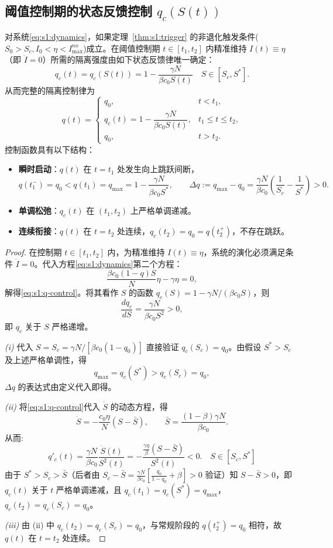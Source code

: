 \documentclass[lang=cn,a4paper,newtx]{elegantpaper}
\numberwithin{equation}{section}
\theoremstyle{plain}
\begin{document}
\subsection{阈值控制期的状态反馈控制 $q_c(S(t))$}
\begin{theorem}
\label{thm:s1:qc-structure}
对系统\eqref{eq:s1:dynamics}，如果定理~\ref{thm:s1:trigger} 的非退化触发条件(\(S_0>S_c,I_0<\eta<I_{\max}^{no}\))成立。在阈值控制期 $t\in[t_1,t_2]$ 内精准维持 $I(t)\equiv\eta$（即 $\dot I=0$）所需的隔离强度由如下状态反馈律唯一确定：
\begin{equation}
q_c(t)=q_c(S(t))=1-\frac{\gamma N}{\beta c_0 S(t)} \quad S\in [S_c,S^*].
\label{eq:s1:q-control}
\end{equation}
从而完整的隔离控制律为
\begin{equation}
q(t)=
\begin{cases}
q_0, & t<t_1,\\
q_c(t)=1-\dfrac{\gamma N}{\beta c_0 S(t)}, & t_1\le t\le t_2,\\
q_0, & t>t_2.
\end{cases}
\label{eq:s1:q-piecewise}
\end{equation}
控制函数具有以下结构：
\begin{itemize}
\item[(i)] \textbf{瞬时启动}：$q(t)$ 在 $t=t_1$ 处发生向上跳跃间断，
\[
q(t_1^-)=q_0<q(t_1)=q_{\max}=1-\frac{\gamma N}{\beta c_0 S^*},
\qquad
\Delta q:=q_{\max}-q_0=\frac{\gamma N}{\beta c_0}\left(\frac{1}{S_c}-\frac{1}{S^*}\right)>0.
\]
\item[(ii)] \textbf{单调松弛}：$q_c(t)$ 在 $(t_1,t_2)$ 上严格单调递减。
\item[(iii)] \textbf{连续衔接}：$q(t)$ 在 $t=t_2$ 处连续，$q_c(t_2)=q_0=q(t_2^+)$，不存在跳跃。
\end{itemize}
\end{theorem}
\begin{proof}
在控制期 $t\in[t_1,t_2]$ 内，为精准维持 $I(t)\equiv\eta$，系统的演化必须满足条件 $\dot I=0$。代入方程\eqref{eq:s1:dynamics}第二个方程：
\[
\frac{\beta c_0(1-q)S}{N}\eta-\gamma\eta=0,
\]
解得\eqref{eq:s1:q-control}。将其看作 $S$ 的函数 $q_c(S)=1-\gamma N/(\beta c_0 S)$，则
\[
\frac{dq_c}{dS}=\frac{\gamma N}{\beta c_0 S^2}>0,
\]
即 $q_c$ 关于 $S$ 严格递增。

\emph{(i)} 代入 $S=S_c=\gamma N/[\beta c_0(1-q_0)]$ 直接验证 $q_c(S_c)=q_0$。由假设 $S^*>S_c$ 及上述严格单调性，得
\[
q_{\max}=q_c(S^*)>q_c(S_c)=q_0,
\]
$\Delta q$ 的表达式由定义代入即得。

\emph{(ii)} 将\eqref{eq:s1:q-control}代入 $\dot S$ 的动态方程，得
\[
\dot S=-\frac{c_0\eta}{N}(S-\bar S),\qquad \bar S=\frac{(1-\beta)\gamma N}{\beta c_0}.
\]
从而:
\[
q'_c(t)=\frac{\gamma N}{\beta c_0} \frac{\dot{S}(t)}{S^{2}(t)}=- \frac{\frac{\gamma \eta}{\beta}(S-\bar S)}{S^{2}(t)}<0.\quad S\in [S_c,S^*]
\]
由于 $S^*>S_c>\bar S$（后者由 $S_c-\bar S=\frac{\gamma N}{\beta c_0}\left[\frac{q_0}{1-q_0}+\beta\right]>0$ 验证）知 $S-\bar S>0$，即 $q_c(t)$ 关于 $t$ 严格单调递减，且 $q_c(t_1)=q_c(S^*)=q_{\max}$，$q_c(t_2)=q_c(S_c)=q_0$。

\emph{(iii)} 由 (ii) 中 $q_c(t_2)=q_c(S_c)=q_0$，与常规阶段的 $q(t_2^+)=q_0$ 相符，故 $q(t)$ 在 $t=t_2$ 处连续。
\end{proof}
\end{document}
